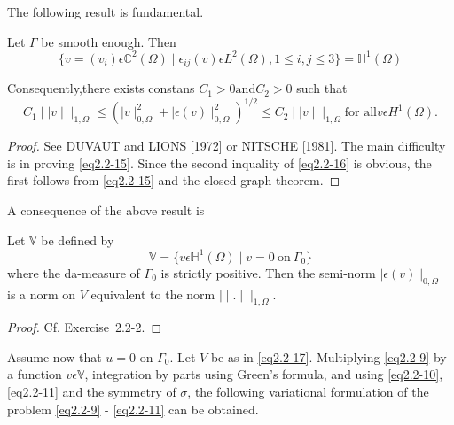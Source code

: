  The following result is fundamental.
  
 \begin{theorem}%
    Let $\Gamma$ be smooth enough. Then
    \begin{equation*}
      \{v=(v_i)\epsilon \mathbb{C}^2(\Omega)\mid \epsilon_{ij}(v)
      \epsilon L^2(\Omega), 1 \leq i,j\leq 3\} = 
      \mathbb{H}^1(\Omega)\tag{2.2-15} \label{eq2.2-15}
  \end{equation*}

    Consequently,\pageoriginale there exists constans $C_1 > 0 \text
    {and} C_2 > 0$ such that 
  \begin{equation*}
    C_1 \mid \mid v \mid \mid _{1,\Omega} \le (\mid v \mid ^2_{0,
      \Omega}+ \mid \epsilon (v) \mid ^2_{0,\Omega})^{1/2} \le C_2
    \mid \mid v \mid \mid _{1,\Omega}\text{for all} v \epsilon H^1
    (\Omega).\tag{2.2-16} \label{eq2.2-16}
  \end{equation*}
\end{theorem} 
  
\begin{proof}
  See DUVAUT and LIONS [1972] or NITSCHE [1981]. The main
  difficulty is in proving \eqref{eq2.2-15}. Since the second inquality of
  \eqref{eq2.2-16} is obvious, the first follows from \eqref{eq2.2-15}
  and the closed graph theorem. 
\end{proof} 
  
A consequence of the above result is
 
\begin{theorem}\label{chap2-thm2.2.2}%
  Let $\mathbb{V}$ be defined by 
\begin{equation*}
  \mathbb{V} = \{v \epsilon \mathbb{H}^1 (\Omega) \mid v =0
  ~\text{on}~ \Gamma_0\}\tag{2.2-17}\label{eq2.2-17} 
 \end{equation*} 
 where the da-measure of $\Gamma_0$ is strictly positive. Then the
 semi-norm $\mid \epsilon (v)\mid _{0, \Omega}$ is a norm on $V$
 equivalent to the norm $\mid \mid . \mid \mid _{1,\Omega}$.  
\end{theorem}

\begin{proof}
Cf. Exercise~2.2-2.
\end{proof}

Assume now that $u=0$ on $\Gamma_0$. Let $V$ be as in
\eqref{eq2.2-17}. Multiplying \eqref{eq2.2-9} by a function $v \epsilon
\mathbb{V}$, integration by parts using Green's formula, and using
\eqref{eq2.2-10}, \eqref{eq2.2-11} and the symmetry of $\sigma$, the following
variational formulation of the problem \eqref{eq2.2-9} -
\eqref{eq2.2-11} can be obtained. 
   

